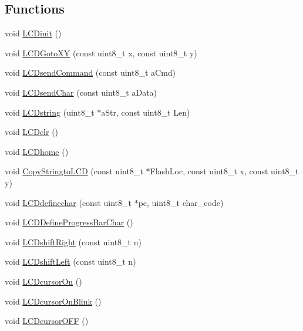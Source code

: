 \subsection*{Functions}
\begin{DoxyCompactItemize}
\item 
void \hyperlink{group__ex4__lcd_ga77153afe052be2c883ce0e9c50eaf63d}{L\-C\-Dinit} ()
\item 
void \hyperlink{group__ex4__lcd_gafaa9fe41c1808137a3d32fd71372661c}{L\-C\-D\-Goto\-X\-Y} (const uint8\-\_\-t x, const uint8\-\_\-t y)
\item 
void \hyperlink{group__ex4__lcd_ga4710a0b6f36e342772ad947fa447d190}{L\-C\-Dsend\-Command} (const uint8\-\_\-t a\-Cmd)
\item 
void \hyperlink{group__ex4__lcd_gadb5ff187143f008fd0ed922676fa414f}{L\-C\-Dsend\-Char} (const uint8\-\_\-t a\-Data)
\item 
void \hyperlink{group__ex4__lcd_gad1cf8811db2211b747b0a93d4dc2a0d8}{L\-C\-Dstring} (uint8\-\_\-t $\ast$a\-Str, const uint8\-\_\-t Len)
\item 
void \hyperlink{group__ex4__lcd_gad15caf49a84798154ce0b0841f4eab4e}{L\-C\-Dclr} ()
\item 
void \hyperlink{group__ex4__lcd_ga4a8e4cac4b59cb6af62a246aa8762384}{L\-C\-Dhome} ()
\item 
void \hyperlink{group__ex4__lcd_ga46c67005c45823c6640631797705981b}{Copy\-Stringto\-L\-C\-D} (const uint8\-\_\-t $\ast$Flash\-Loc, const uint8\-\_\-t x, const uint8\-\_\-t y)
\item 
void \hyperlink{group__ex4__lcd_gafd1b77cff1d25838546f2e7c59d8ea6f}{L\-C\-Ddefinechar} (const uint8\-\_\-t $\ast$pc, uint8\-\_\-t char\-\_\-code)
\item 
void \hyperlink{group__ex4__lcd_gaa8b38038830831bf9f88f6fda050ddbc}{L\-C\-D\-Define\-Progress\-Bar\-Char} ()
\item 
void \hyperlink{group__ex4__lcd_gaa88c35fa982ea61de198ac213fd032e9}{L\-C\-Dshift\-Right} (const uint8\-\_\-t n)
\item 
void \hyperlink{group__ex4__lcd_gacc91628178929f4293a4e3b8be10d367}{L\-C\-Dshift\-Left} (const uint8\-\_\-t n)
\item 
void \hyperlink{group__ex4__lcd_gada84f0cf813b16535b072adca9c7f31e}{L\-C\-Dcursor\-On} ()
\item 
void \hyperlink{group__ex4__lcd_gadbceaac1e9d5eed34155fb24c85dd04e}{L\-C\-Dcursor\-On\-Blink} ()
\item 
void \hyperlink{group__ex4__lcd_ga11c2b242fbdc8d011ceb6160900c4c3b}{L\-C\-Dcursor\-O\-F\-F} ()

\end{DoxyCompactItemize}
